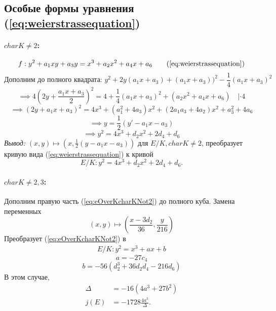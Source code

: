 \documentclass[12pt]{article}
\theoremstyle{definition}
\theoremstyle{definition}
\theoremstyle{definition}
\begin{document}
        \subsection{Особые формы уравнения (\ref{eq:weierstrassequation})}
            \paragraph{$char K \neq 2$:}
            \begin{equation*}
                f: y^2+a_1xy + a_3y = x^3 + a_2x^2 + a_4x + a_6 \tag{\ref{eq:weierstrassequation}}
            \end{equation*}
            \[
            \text{Дополним до полного квадрата: } y^2 + 2y(a_1x+a_3)+(a_1x+a_3))^2- \frac{1}{4}(a_1x+a_3)^2
            \]
            \[
            \implies 4(2y + \frac{a_1x+a_3}{2})^2 = 4 + \frac{1}{4}(a_1x+a_3)^2 + (a_2x^2 + a_4x + a_6) \quad| \cdot 4
            \]
            \[
            \implies (2y + a_1x+a_3)^2 = 4x^3 + (a_1^2 + 4a_3)x^2 + (2a_1a_3 + 4a_2)x^2 + a_3^2 + 4a_6
            \]
            \[
            \implies y = \frac{1}{2}(y' - a_1x - a_3)
            \]
            \[
            \implies y^2 = 4x^3 + d_2x^2 + 2d_4 + d_6
            \]
            \textit{Вывод: } $(x, y)\mapsto(x, \frac{1}{2}(y-a_1x-a_3))$ для $E/K, char K \neq 2$, преобразует кривую вида (\ref{eq:weierstrassequation}) к кривой
            \begin{equation}
            \label{eq:eOverKcharKNot2}
                E/K: y^2 = 4x^3 + d_2x^2 + 2d_4 + d_6.
            \end{equation}
            
            \paragraph{$char K \neq 2, 3$:} 
            Дополним правую часть (\ref{eq:eOverKcharKNot2}) до полного куба. Замена переменных
            \[
            (x, y) \mapsto \left(\frac{x-3d_2}{36}, \frac{y}{216}\right)
            \]
            Преобразует (\ref{eq:eOverKcharKNot2}) в 
            \begin{align}
                E/K: y^2 = x^3 + ax + b
            \end{align}
            \[
                a = -27c_4
            \]
            \[
                b = -56(d_2^3 + 36d_2d_4 - 216d_6) 
            \]
            В этом случае, 
            \begin{align*}
                \Delta &= -16(4a^3 + 27b^2) \\ \nonumber
                j(E) &= -1728 \frac{4a^3}{\Delta}. \nonumber
            \end{align*}
                  
\end{document}
